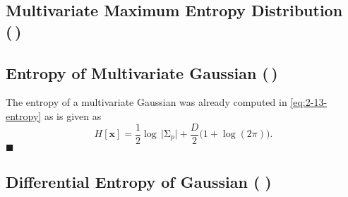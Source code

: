 \documentclass[11pt, a4paper]{scrartcl}
\renewcommand{\vec}[1]{\bm{#1}}
\newcommand{\mat}[1]{\bm{\mathrm{#1}}}
\newcommand{\eot}{\hfill\(\blacksquare\)}
\newcommand{\diffstar}{\texorpdfstring{\raisebox{-1pt}{\resizebox{!}{8pt}{\(\star\)}}}{*}}
\newcommand{\twostar}  {(\diffstar\,\diffstar)}
\newcommand{\threestar}{(\diffstar\,\diffstar\,\diffstar)}
\begin{document}
		\subsection{Multivariate Maximum Entropy Distribution  \twostar}

		\subsection{Entropy of Multivariate Gaussian  \twostar}
			The entropy of a multivariate Gaussian was already computed in \eqref{eq:2-13-entropy} as is given as
			\begin{equation}
				H[\vec{x}] = \frac{1}{2} \log \, \lvert \mat{\Sigma}_p \rvert + \frac{D}{2} \big(1 + \log(2\pi)\big).
			\end{equation}
			\eot

		\subsection{Differential Entropy of Gaussian  \threestar}
\end{document}
